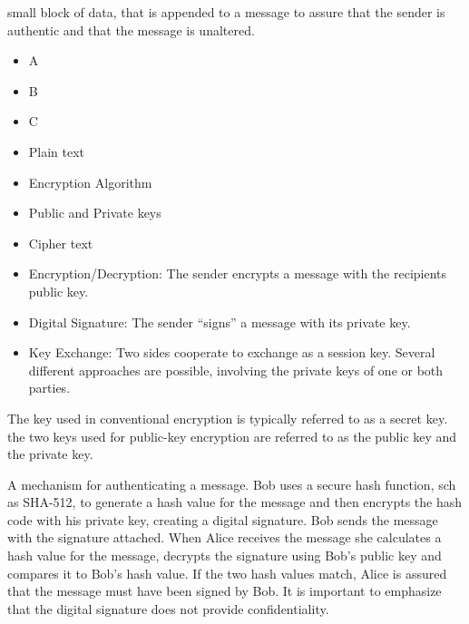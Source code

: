 \documentclass[../CIT288SecurityResearchNotebook.tex]{subfiles}
\begin{document}

small block of data, that is appended to a message to assure that the sender is authentic and that the message is
	unaltered.


\begin{itemize}
	\item A
	\item B
	\item C
\end{itemize}


\begin{itemize}
	\item Plain text
	\item Encryption Algorithm
	\item Public and Private keys
	\item Cipher text
\end{itemize}


\begin{itemize}
	\item Encryption/Decryption: The sender encrypts a message with the recipients public key.
	\item Digital Signature: The sender ``signs'' a message with its private key.
	\item Key Exchange: Two sides cooperate to exchange as a session key. Several different approaches are possible, involving
	the private keys of one or both parties.
\end{itemize}


The key used in conventional encryption is typically referred to as a secret key. the two keys used for public-key
	encryption are referred to as the public key and the private key.


A mechanism for authenticating a message. Bob uses a secure hash function, sch as SHA-512, to generate a hash value
	for the message and then encrypts the hash code with his private key, creating a digital signature. Bob sends the
	message with the signature attached. When Alice receives the message she calculates a hash value for the message,
	decrypts the signature using Bob's public key and compares it to Bob's hash value. If the two hash values match,
	Alice is assured that the message must have been signed by Bob. It is important to emphasize that the digital
	signature does not provide confidentiality.
\end{document}
